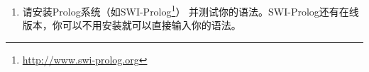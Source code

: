 {\begin{enumerate}
\eal
\ex 
\gll Der Mann hilft der Frau jetzt.\\
     .\nom{} 男人 帮助 .\dat{} 女人 现在\\
\ex 
\gll Der Mann hilft der Frau neben dem Bushäuschen.\\
     .\nom{} 男人 帮助 .\dat{} 女人 在……旁  公交车候车亭\\
\ex 
\gll Er gibt ihr das Buch jetzt.\\
     他.\nom{} 给 她.\dat{} .\acc{} 书 现在\\
\ex 
\gll Er gibt ihr das Buch neben dem Bushäuschen.\\
     他.\nom{} 给 她.\dat{} .\acc{} 书 在……旁  公交车候车亭\\
\ex 
\gll Er wartet jetzt auf ein Wunder.\\
     他.\nom{} 等 现在 \textsc{prep} 一 奇迹\\
\ex 
\gll Er wartet neben dem Bushäuschen auf ein Wunder.\\
      他.\nom{} 等 在……旁 .\dat{} 公交车候车亭 \textsc{prep} 一 奇迹\\
\zl
\item 请安装Prolog系统（如SWI-Prolog\footnote{%
\url{http://www.swi-prolog.org} 
}）
并测试你的语法。SWI-Prolog还有在线版本，你可以不用安装就可以直接输入你的语法。\dotfootnote{%
}
\end{enumerate}}
